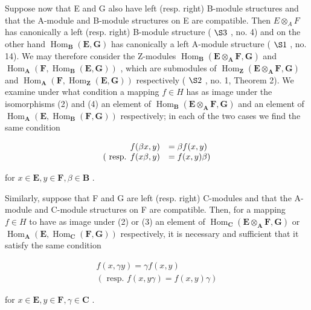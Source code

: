 Suppose now that E and G also have left (resp. right) B-module structures and that the A-module and B-module structures on E are compatible. Then \(E \otimes_{A} F\) has canonically a left (resp. right) B-module structure ( \(\S 3\) , no. 4) and on the other hand \(\operatorname{Hom}_{\mathbf{B}}(\mathbf{E}, \mathbf{G})\) has canonically a left A-module structure ( \(\S 1\) , no. 14). We may therefore consider the Z-modules \(\operatorname{Hom}_{\mathbf{B}}(\mathbf{E} \otimes_{\mathbf{A}} \mathbf{F}, \mathbf{G})\) and \(\operatorname{Hom}_{\mathbf{A}}(\mathbf{F}, \operatorname{Hom}_{\mathbf{B}}(\mathbf{E}, \mathbf{G}))\) , which are submodules of \(\operatorname{Hom}_{\mathbf{Z}}(\mathbf{E} \otimes_{\mathbf{A}} \mathbf{F}, \mathbf{G})\) and \(\operatorname{Hom}_{\mathbf{A}}(\mathbf{F}, \operatorname{Hom}_{\mathbf{Z}}(\mathbf{E}, \mathbf{G}))\) respectively ( \(\S 2\) , no. 1, Theorem 2). We examine under what condition a mapping \(f \in H\) has as image under the isomorphisms (2) and (4) an element of \(\operatorname{Hom}_{\mathbf{B}}(\mathbf{E} \otimes_{\mathbf{A}} \mathbf{F}, \mathbf{G})\) and an element of \(\operatorname{Hom}_{\mathbf{A}}(\mathbf{E}, \operatorname{Hom}_{\mathbf{B}}(\mathbf{F}, \mathbf{G}))\) respectively; in each of the two cases we find the same condition

\[
\begin{array}{r l} f (\beta x, y) & = \beta f (x, y) \\ (\text { resp.   } f (x \beta , y) & = f (x, y) \beta) \end{array}
\]

for \(x \in \mathbf{E}, y \in \mathbf{F}, \beta \in \mathbf{B}\) .

Similarly, suppose that F and G are left (resp. right) C-modules and that the A-module and C-module structures on F are compatible. Then, for a mapping \(f \in H\) to have as image under (2) or (3) an element of \(\operatorname{Hom}_{\mathbf{C}}(\mathbf{E} \otimes_{\mathbf{A}} \mathbf{F}, \mathbf{G})\) or \(\operatorname{Hom}_{\mathbf{A}}(\mathbf{E}, \operatorname{Hom}_{\mathbf{C}}(\mathbf{F}, \mathbf{G}))\) respectively, it is necessary and sufficient that it satisfy the same condition

\[
\begin{array}{c} f (x, \gamma y) = \gamma f (x, y) \\ (\text { resp. } f (x, y \gamma) = f (x, y) \gamma) \end{array}
\]

for \(x \in \mathbf{E}, y \in \mathbf{F}, \gamma \in \mathbf{C}\) .

